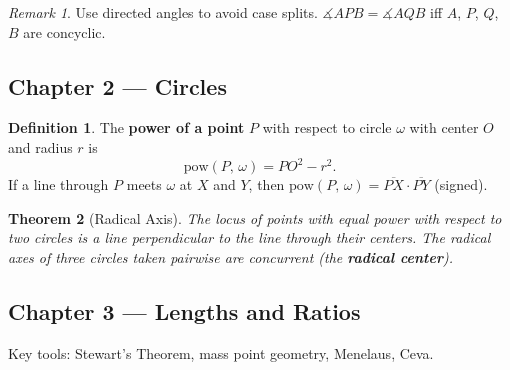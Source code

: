 \documentclass[11pt, letterpaper]{article}
\newtheorem{theorem}{Theorem}[section]
\theoremstyle{definition}
\newtheorem{definition}[theorem]{Definition}
\theoremstyle{remark}
\newtheorem*{remark}{Remark}
\newcommand{\dang}{\measuredangle}          %
\newcommand{\pow}[2]{\mathrm{pow}(#1,\,#2)}
\begin{document}
\begin{remark}
  Use directed angles to avoid case splits. $\dang APB = \dang AQB$ iff
  $A$, $P$, $Q$, $B$ are concyclic.
\end{remark}

\subsection{Chapter 2 — Circles}

\begin{definition}
  The \textbf{power of a point} $P$ with respect to circle $\omega$ with
  center $O$ and radius $r$ is
  \[
    \pow{P}{\omega} = PO^2 - r^2.
  \]
  If a line through $P$ meets $\omega$ at $X$ and $Y$, then
  $\pow{P}{\omega} = \overline{PX} \cdot \overline{PY}$ (signed).
\end{definition}

\begin{theorem}[Radical Axis]
  The locus of points with equal power with respect to two circles is a line
  perpendicular to the line through their centers. The radical axes of three
  circles taken pairwise are concurrent (the \textbf{radical center}).
\end{theorem}

\begin{center}
\end{center}

\subsection{Chapter 3 — Lengths and Ratios}

Key tools: Stewart's Theorem, mass point geometry, Menelaus, Ceva.
\end{document}

